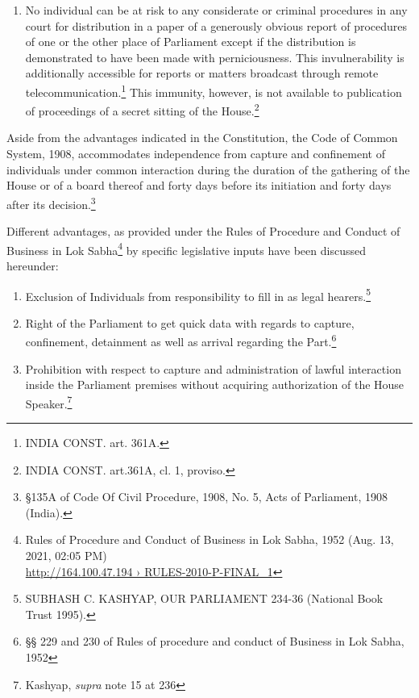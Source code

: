 \begin{multicols}{2}
\begin{enumerate}[label=$\bullet$]
\item  No individual can be at risk to any considerate or criminal procedures in any
court for distribution in a paper of a generously obvious report of procedures
of one or the other place of Parliament except if the distribution is
demonstrated to have been made with perniciousness. This invulnerability is
additionally accessible for reports or matters broadcast through remote
telecommunication.\footnote{INDIA CONST. art. 361A.} This immunity, however, is not available to publication
of proceedings of a secret sitting of the House.\footnote{INDIA CONST. art.361A, cl. 1, proviso.}
\end{enumerate}

\vspace{-.3cm}

\noi
Aside from the advantages indicated in the Constitution, the Code of Common System, 1908,
accommodates independence from capture and confinement of individuals under common
interaction during the duration of the gathering of the House or of a board thereof and forty
days before its initiation and forty days after its decision.\footnote{§135A of Code Of Civil Procedure, 1908, No. 5, Acts of Parliament, 1908 (India).}

\noi
Different advantages, as provided under the Rules of Procedure and Conduct of Business in
Lok Sabha\footnote{Rules of Procedure and Conduct of Business in Lok Sabha, 1952 (Aug. 13, 2021, 02:05 PM) \\ \url{http://164.100.47.194 › RULES-2010-P-FINAL_1}} by specific legislative inputs have been discussed hereunder:

\begin{enumerate}[label=$\bullet$]
\itemsep=0pt
\item Exclusion of Individuals from responsibility to fill in as legal hearers.\footnote{SUBHASH C. KASHYAP, OUR PARLIAMENT 234-36 (National Book Trust 1995).}

\item Right of the Parliament to get quick data with regards to capture, confinement,
detainment as well as arrival regarding the Part.\footnote{§§ 229 and 230 of Rules of procedure and conduct of Business in Lok Sabha, 1952}

\item Prohibition with respect to capture and administration of lawful interaction
inside the Parliament premises without acquiring authorization of the House
Speaker.\footnote{Kashyap, \textit{supra} note 15 at 236}


\end{enumerate}
\end{multicols}
